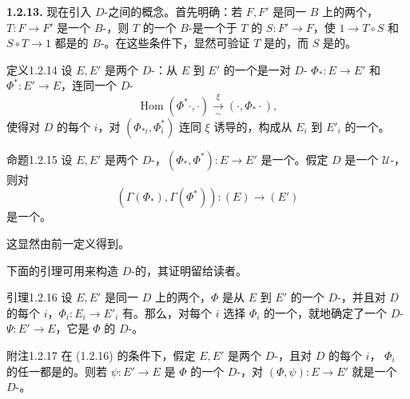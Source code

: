 \textbf{1.2.13.} 现在引入 $D$-之间的概念。首先明确：若 $F,F'$ 是同一 $B$ 上的两个，$T:F\to F'$ 是一个 $B$-，则 $T$ 的一个 $B$-是一个于 $T$ 的 $S:F'\to F$，使 $1\to T\circ S$
和 $S\circ T\to1$ 都是的 $B$-。在这些条件下，显然可验证 $T$ 是的，而 $S$ 是的。

\begin{SGAresult}{定义}{1.2.14}
设 $E,E'$ 是两个 $D$-：从 $E$ 到 $E'$ 的一个是一对 $D$- $\Phi_*:E\to E'$ 和 $\Phi^*:E'\to E$，连同一个 $D$-
\[
\operatorname{Hom}(\Phi^*\cdot,\cdot)\xrightarrow[\sim]{\xi}(\cdot,\Phi_*\cdot),
\]
使得对 $D$ 的每个 $i$，对 $(\Phi_{*i},\Phi_i^*)$ 连同 $\xi$ 诱导的，构成从 $E_i$ 到 $E'_i$ 的一个。
\end{SGAresult}

\begin{SGAresult}{命题}{1.2.15}
设 $E,E'$ 是两个 $D$-，$(\Phi_*,\Phi^*):E\to E'$ 是一个。假定 $D$ 是一个 $\mathcal U$-，则对
\[
(\Gamma(\Phi_*),\Gamma(\Phi^*)):(E)\longrightarrow(E')
\]
是一个。
\end{SGAresult}
这显然由前一定义得到。

下面的引理可用来构造 $D$-的，其证明留给读者。
\begin{SGAresult}{引理}{1.2.16}
设 $E,E'$ 是同一 $D$ 上的两个，$\Phi$ 是从 $E$ 到 $E'$ 的一个 $D$-，并且对 $D$ 的每个 $i$，$\Phi_i:E_i\to E'_i$ 有。那么，对每个 $i$ 选择 $\Phi_i$ 的一个，就地确定了一个 $D$- $\Psi:E'\to E$，它是 $\Phi$ 的 $D$-。
\end{SGAresult}
\begin{SGAresult}{附注}{1.2.17}
在 (1.2.16) 的条件下，假定 $E,E'$ 是两个 $D$-，且对 $D$ 的每个 $i$， $\Phi_i$ 的任一都是的。则若 $\psi:E'\to E$ 是 $\Phi$ 的一个 $D$-，对 $(\Phi,\psi):E\to E'$ 就是一个 $D$-。
\end{SGAresult}

